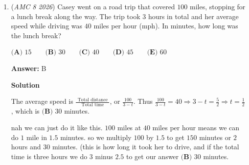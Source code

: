 \begin{enumerate}
 We can also do it just with percentages. He has $100\%$ then loses $20\%$, meaning he now has $80\%$. Then he gains $50$ percent of our NEW amount (which is $80$ percent) and $50$ percent of $80$ is $40$ percent, so we add $40$ and $80$ to get our answer, $\boxed{ \textbf{(E) } 120 }\%$.

 You can also do it with fractions. You can say you have $\frac{100}{100}$ at the beginning, then losing $20\%$ would result in $\frac{80}{100}$. $50\%$ of $\frac{80}{100}$ is $\frac{40}{100}$. Adding $\frac{40}{100}$ to the original $\frac{80}{100}$ gives $\frac{120}{100}$, which is $\boxed{ \textbf{(E) } 120 }\%$ of $\frac{100}{100}$.

 



\textbf{Solution 3}

Let Brynn's savings be $x$. Then, in July from $x$ his savings went down $x - \frac{1}{5}x = \frac{4}{5}x$. From that amount, it increased $50\%$ in August, meaning we have $\frac{8}{10}x + \frac{4}{10}x = \frac{12}{10}x = \frac{6}{5}x$ remaining. Of the total $x$, which is $\frac{\frac{6}{5}x}{x}$, we see that the $x$ cancel out and the increase is $\frac{6}{5}$, or $\boxed{120}$\%

 


	\item (\textit{AMC 8 2026}) Casey went on a road trip that covered $100$ miles, stopping for a lunch break along the way. The trip took $3$ hours in total and her average speed while driving was $40$ miles per hour (mph). In minutes, how long was the lunch break?


 $\textbf{(A) }15 \qquad \textbf{(B) }30 \qquad \textbf{(C) }40 \qquad \textbf{(D) }45 \qquad \textbf{(E) }60$

 \textbf{Answer: }B



\textbf{Solution}

The average speed is $\frac{ \text{ Total distance } }{ \text{ Total time } }$, or $\frac{100}{3-t}$. Thus $\frac{100}{3-t} = 40 \Rightarrow 3-t = \frac{5}{2} \Rightarrow t = \frac{1}{2}$, which is $\boxed{ \textbf{(B) } 30}$ minutes.

 nah we can just do it like this. $100$ miles at $40$ miles per hour means we can do $1$ mile in $1.5$ minutes. so we multiply $100$ by $1.5$ to get $150$ minutes or $2$ hours and $30$ minutes. (this is how long it took her to drive, and if the total time is three hours we do $3$ minus $2.5$ to get our answer $\boxed{ \textbf{(B) } 30}$ minutes.


\end{enumerate}
